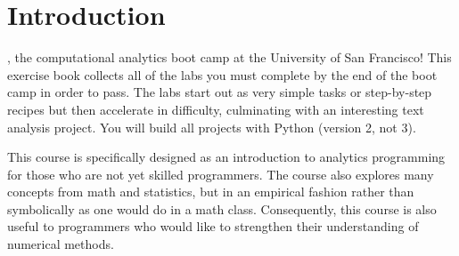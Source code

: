 \documentclass[titlepage]{tufte-book}
\begin{document}

\tableofcontents %

\mainmatter

\chapter*{Introduction}


, the computational analytics boot camp at the University of San Francisco! This exercise book collects all of the labs you must complete by the end of the boot camp in order to pass.  The labs start out as very simple tasks or step-by-step recipes but then accelerate in difficulty, culminating with an interesting text analysis project. You will build all projects with Python (version 2, not 3).

This course is specifically designed as an introduction to analytics programming for those who are not yet skilled programmers. The course also explores many concepts from math and statistics, but in an empirical fashion rather than symbolically as one would do in a math class. Consequently, this course is also useful to programmers who would like to strengthen their understanding of numerical methods.
\end{document}
